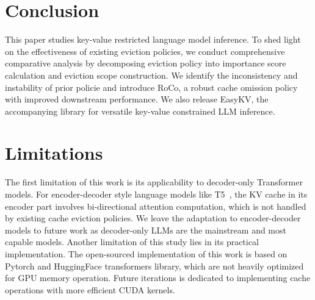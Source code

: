 \section{Conclusion}
This paper studies key-value restricted language model inference. To shed light on the effectiveness of existing eviction policies, we conduct comprehensive comparative analysis by decomposing eviction policy into importance score calculation and eviction scope construction. We identify the inconsistency and instability of prior policie and introduce RoCo, a robust cache omission policy with improved downstream performance. We also release EasyKV, the accompanying library for versatile key-value constrained LLM inference.

\section*{Limitations}
The first limitation of this work is its applicability to decoder-only Transformer models. For encoder-decoder style language models like T5~\cite{t5}, the KV cache in its encoder part involves bi-directional attention computation, which is not handled by existing cache eviction policies. We leave the adaptation to encoder-decoder models to future work as decoder-only LLMs are the mainstream and most capable models. Another limitation of this study lies in its practical implementation. The open-sourced implementation of this work is based on Pytorch and HuggingFace transformers library, which are not heavily optimized for GPU memory operation. Future iterations is dedicated to implementing cache operations with more efficient CUDA kernels.
